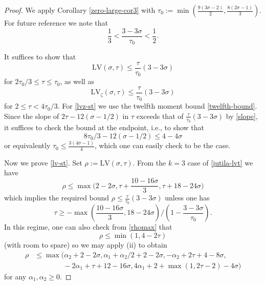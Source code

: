 \documentclass[a4paper, 10pt]{amsart}
\newcommand{\LV}{\mathrm{LV}}
\begin{document}
\begin{proof}
    We apply Corollary \ref{zero-large-cor3} with $\tau_0 := \min( \frac{ 9(3\sigma-2)}{2}, \frac{8(2\sigma-1)}{3} )$.  For future reference we note that
    \begin{equation}\label{slope}
        \frac{1}{3} < \frac{3-3\sigma}{\tau_0} < \frac{1}{2}.
    \end{equation}

    It suffices to show that
    \begin{equation}\label{lv-st}
     \LV(\sigma,\tau) \leq \frac{\tau}{\tau_0} (3-3\sigma)
    \end{equation}
    for $2\tau_0/3 \leq \tau \leq \tau_0$, as well as
    \begin{equation}\label{lvz-st}
    \LV_\zeta(\sigma,\tau) \leq \frac{\tau}{\tau_0} (3-3\sigma)
    \end{equation}
    for $2 \leq \tau < 4\tau_0/3$.
    For \eqref{lvz-st} we use the twelfth moment bound \eqref{twelfth-bound}.  Since the slope of
    $2\tau - 12 (\sigma-1/2)$ in $\tau$ exceeds that of $\frac{\tau}{\tau_0} (3-3\sigma)$ by \eqref{slope}, it suffices to check the bound at the endpoint, i.e., to show that
    $$ 8\tau_0/3 - 12 (\sigma-1/2) \leq 4 -4\sigma$$
    or equivalently $\tau_0 \leq \frac{3(4\sigma-1)}{4}$, which one can easily check to be the case.

    Now we prove \eqref{lv-st}.  Set $\rho := \LV(\sigma,\tau)$.  From the $k=3$ case of \eqref{jutila-lvt} we have
    \begin{equation}\label{rhomax}
        \rho \leq \max \bigg(2-2\sigma, \tau + \frac{10-16\sigma}{3}, \tau + 18-24\sigma \bigg)
    \end{equation}
    which implies the required bound $\rho \leq \frac{\tau}{\tau_0}(3-3\sigma)$ unless one has
    \begin{equation}\label{tau-lower}
        \tau \geq - \max\left( \frac{10-16\sigma}{3}, 18-24\sigma\right) / \left(1 - \frac{3-3\sigma}{\tau_0}\right).
    \end{equation}
    In this regime, one can also check from \eqref{rhomax} that
    $$ \rho \leq \min(1, 4-2\tau)$$
    (with room to spare) so we may apply (ii) to obtain
    \begin{equation*}\label{40-alt}
    \begin{split}
    \rho &\leq \max( \alpha_2 + 2 - 2 \sigma, \alpha_1+\alpha_2/2 + 2-2\sigma, -\alpha_2 + 2\tau+4-8\sigma, \\
    &\qquad\qquad -2\alpha_1 + \tau + 12 - 16 \sigma, 4\alpha_1 + 2+\max(1,2\tau-2)-4\sigma)
    \end{split}
    \end{equation*}
    for any $\alpha_1, \alpha_2 \geq 0$.


\end{proof}
\end{document}
